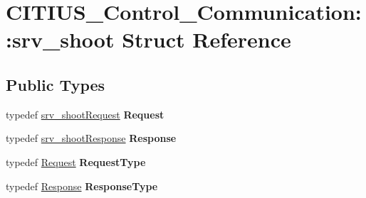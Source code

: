 \hypertarget{struct_c_i_t_i_u_s___control___communication_1_1srv__shoot}{\section{\-C\-I\-T\-I\-U\-S\-\_\-\-Control\-\_\-\-Communication\-:\-:srv\-\_\-shoot \-Struct \-Reference}
\label{struct_c_i_t_i_u_s___control___communication_1_1srv__shoot}
}
\subsection*{\-Public \-Types}
\begin{DoxyCompactItemize}
\item 
\hypertarget{struct_c_i_t_i_u_s___control___communication_1_1srv__shoot_af8269d49b5e51e3565ec5b99677ee82b}{typedef \hyperlink{struct_c_i_t_i_u_s___control___communication_1_1srv__shoot_request__}{srv\-\_\-shoot\-Request} {\bfseries \-Request}}\label{struct_c_i_t_i_u_s___control___communication_1_1srv__shoot_af8269d49b5e51e3565ec5b99677ee82b}

\item 
\hypertarget{struct_c_i_t_i_u_s___control___communication_1_1srv__shoot_a1287d19959e83513008acfa7c15773b8}{typedef \hyperlink{struct_c_i_t_i_u_s___control___communication_1_1srv__shoot_response__}{srv\-\_\-shoot\-Response} {\bfseries \-Response}}\label{struct_c_i_t_i_u_s___control___communication_1_1srv__shoot_a1287d19959e83513008acfa7c15773b8}

\item 
\hypertarget{struct_c_i_t_i_u_s___control___communication_1_1srv__shoot_ab12f9bb55d6671163e096b99917ad9f6}{typedef \hyperlink{struct_c_i_t_i_u_s___control___communication_1_1srv__shoot_request__}{\-Request} {\bfseries \-Request\-Type}}\label{struct_c_i_t_i_u_s___control___communication_1_1srv__shoot_ab12f9bb55d6671163e096b99917ad9f6}

\item 
\hypertarget{struct_c_i_t_i_u_s___control___communication_1_1srv__shoot_aa48774fbeab10d5fd3378b08a12db3c2}{typedef \hyperlink{struct_c_i_t_i_u_s___control___communication_1_1srv__shoot_response__}{\-Response} {\bfseries \-Response\-Type}}\label{struct_c_i_t_i_u_s___control___communication_1_1srv__shoot_aa48774fbeab10d5fd3378b08a12db3c2}

\end{DoxyCompactItemize}
